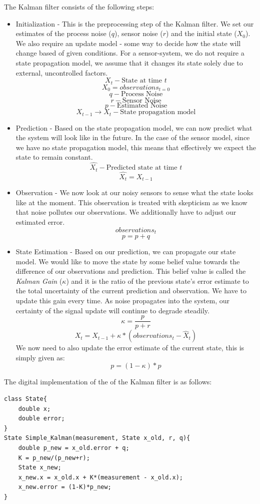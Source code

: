 \documentclass{article}
\theoremstyle{plain}
\theoremstyle{definition}
\theoremstyle{remark}
\begin{document}
The Kalman filter consists of the following steps:
\begin{itemize}
\item Initialization - This is the preprocessing step of the Kalman filter. We set our estimates of the process noise ($q$), sensor noise ($r$) and the initial state ($X_0$). We also require an update model - some way to decide how the state will change based of given conditions. For a sensor-system, we do not require a state propagation model, we assume that it changes its state solely due to external, uncontrolled factors.
$$X_t - \text{State at time }t$$
$$X_0 = observations_{t = 0}$$
$$q - \text{Process Noise}$$
$$r - \text{Sensor Noise}$$
$$p - \text{Estimated Noise}$$
$$X_{t-1} \rightarrow X_t - \text{State propagation model}$$

\item Prediction - Based on the state propagation model, we can now predict what the system will look like in the future. In the case of the sensor model, since we have no state propagation model, this means that effectively we expect the state to remain constant.
$$\hat{X_{t}} -\text{Predicted state at time }t$$
$$\hat{X_{t}} = X_{t-1}$$

\item Observation - We now look at our noisy sensors to sense what the state looks like at the moment. This observation is treated with skepticism as we know that noise pollutes our observations. We additionally have to adjust our estimated error.
$$observations_{t}$$
$$p = p+q$$

\item State Estimation - Based on our prediction, we can propagate our state model. We would like to move the state by some belief value towards the difference of our observations and prediction. This belief value is called the \emph{Kalman Gain} ($\kappa$) and it is the ratio of the previous state's error estimate to the total uncertainty of the current prediction and observation. We have to update this gain every time. As noise propagates into the system, our certainty of the signal update will continue to degrade steadily. 
$$\kappa =  \frac{p}{p+r}$$
$$X_{t} = X_{t-1} + \kappa * (observations_t- \hat{X}_t)$$
We now need to also update the error estimate of the current state, this is simply given as:
$$p = (1 - \kappa) * p$$
\end{itemize}

The digital implementation of the of the Kalman filter is as follows:
\begin{verbatim}
class State{
    double x;
    double error;
}
State Simple_Kalman(measurement, State x_old, r, q){
    double p_new = x_old.error + q;
    K = p_new/(p_new+r);
    State x_new;
    x_new.x = x_old.x + K*(measurement - x_old.x);
    x_new.error = (1-K)*p_new;
}
\end{verbatim}
\end{document}
